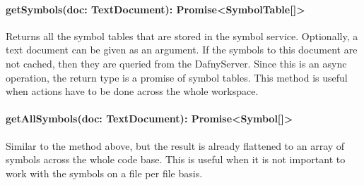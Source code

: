 \paragraph{getSymbols(doc: TextDocument): Promise<SymbolTable[]>} Returns all the symbol tables that are stored in the symbol service. Optionally, a text document can be given as an argument. If the symbols to this document are not cached, then they are queried from the DafnyServer. Since this is an async operation, the return type is a promise of symbol tables. This method is useful when actions have to be done across the whole workspace.

\paragraph{getAllSymbols(doc: TextDocument): Promise<Symbol[]>} Similar to the method above, but the result is already flattened to an array of symbols across the whole code base. This is useful when it is not important to work with the symbols on a file per file basis.

